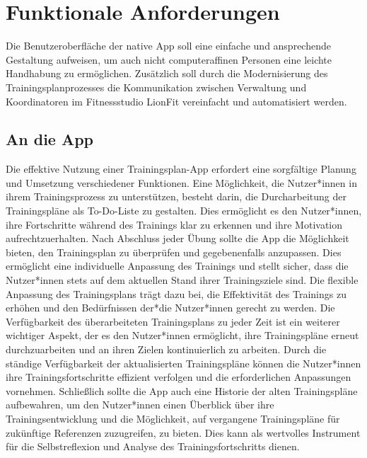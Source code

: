 \section{Funktionale Anforderungen}
Die Benutzeroberfläche der native App soll eine einfache und 
ansprechende Gestaltung aufweisen, um auch nicht computeraffinen Personen eine leichte 
Handhabung zu ermöglichen. Zusätzlich soll durch die Modernisierung des Trainingsplanprozesses 
die Kommunikation zwischen Verwaltung und Koordinatoren im Fitnessstudio LionFit vereinfacht 
und automatisiert werden.

\subsection{An die App}
Die effektive Nutzung einer Trainingsplan-App erfordert eine sorgfältige Planung und Umsetzung verschiedener Funktionen. Eine Möglichkeit, die Nutzer*innen in ihrem Trainingsprozess zu unterstützen, besteht darin, die Durcharbeitung der Trainingspläne als To-Do-Liste zu gestalten. Dies ermöglicht es den Nutzer*innen, ihre Fortschritte während des Trainings klar zu erkennen und ihre Motivation aufrechtzuerhalten.
\newline
\newline
Nach Abschluss jeder Übung sollte die App die Möglichkeit bieten, den Trainingsplan zu überprüfen und gegebenenfalls anzupassen. Dies ermöglicht eine individuelle Anpassung des Trainings und stellt sicher, dass die Nutzer*innen stets auf dem aktuellen Stand ihrer Trainingsziele sind. Die flexible Anpassung des Trainingsplans trägt dazu bei, die Effektivität des Trainings zu erhöhen und den Bedürfnissen der*die Nutzer*innen gerecht zu werden.
\newpage
Die Verfügbarkeit des überarbeiteten Trainingsplans zu jeder Zeit ist ein weiterer wichtiger Aspekt, der es den Nutzer*innen ermöglicht, ihre Trainingspläne erneut durchzuarbeiten und an ihren Zielen kontinuierlich zu arbeiten. Durch die ständige Verfügbarkeit der aktualisierten Trainingspläne können die Nutzer*innen ihre Trainingsfortschritte effizient verfolgen und die erforderlichen Anpassungen vornehmen.
\newline
\newline
Schließlich sollte die App auch eine Historie der alten Trainingspläne aufbewahren, um den Nutzer*innen einen Überblick über ihre Trainingsentwicklung und die Möglichkeit, auf vergangene Trainingspläne für zukünftige Referenzen zuzugreifen, zu bieten. Dies kann als wertvolles Instrument für die Selbstreflexion und Analyse des Trainingsfortschritts dienen.

